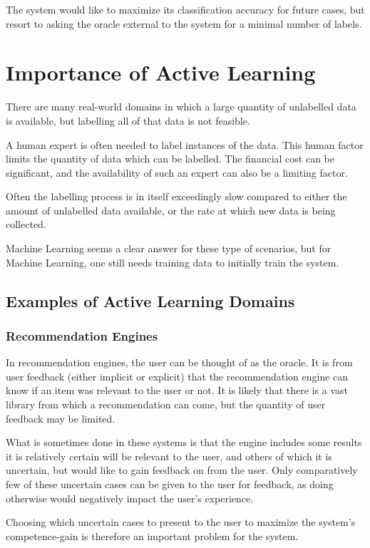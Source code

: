 \documentclass[a4paper,11pt]{report}
\begin{document}
The system would like to maximize its classification accuracy for future cases, but resort to asking the oracle external to the system for a minimal number of labels.

\section{Importance of Active Learning}
There are many real-world domains in which a large quantity of unlabelled data is available, but labelling all of that data is not feasible. 

A human expert is often needed to label instances of the data. This human factor limits the quantity of data which can be labelled. The financial cost can be significant, and the availability of such an expert can also be a limiting factor.

Often the labelling process is in itself exceedingly slow compared to either the amount of unlabelled data available, or the rate at which new data is being collected. 

Machine Learning seems a clear answer for these type of scenarios, but for Machine Learning, one still needs training data to initially train the system.

\subsection{Examples of Active Learning Domains}
\subsubsection{Recommendation Engines}
In recommendation engines, the user can be thought of as the oracle. It is from user feedback (either implicit or explicit) that the recommendation engine can know if an item was relevant to the user or not. It is likely that there is a vast library from which a recommendation can come, but the quantity of user feedback may be limited.

What is sometimes done in these systems is that the engine includes some results it is relatively certain will be relevant to the user, and others of which it is uncertain, but would like to gain feedback on from the user. Only comparatively few of these uncertain cases can be given to the user for feedback, as doing otherwise would negatively impact the user's experience.

Choosing which uncertain cases to present to the user to maximize the system's competence-gain is therefore an important problem for the system.
\end{document}
